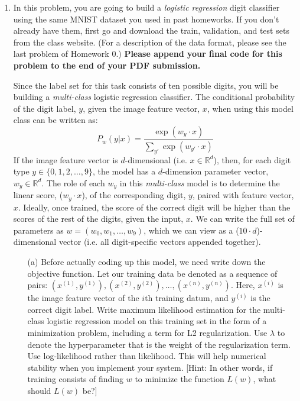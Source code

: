 \documentclass[10pt]{report}
\begin{document}
\begin{enumerate}
\begin{solution}
\end{solution}

\item In this problem, you are going to build a {\em logistic regression} digit classifier using the same MNIST dataset you used in past homeworks. If you don't already have them, first go and download the train, validation, and test sets from the class website. (For a description of the data format, please see the last problem of Homework 0.)  {\bf Please append your final code for this problem to the end of your PDF submission.}

\vspace{0.7em}

Since the label set for this task consists of ten possible digits, you will be building a {\em multi-class} logistic regression classifier. The conditional probability of the digit label, $y$, given the image feature vector, $x$, when using this model class can be written as:
\[
P_w(y|x) = \frac{\exp (w_y \cdot x)}{\sum_{y'} \exp (w_{y'} \cdot x)}       \]
If the image feature vector is $d$-dimensional (i.e. $x \in \mathbb{R}^d$), then, for each digit type $y \in \{0,1,2, \ldots, 9\}$, the model has a $d$-dimension parameter vector, $w_y \in \mathbb{R}^d$. The role of each $w_y$ in this {\em multi-class} model is to determine the linear score, ($w_y \cdot x$), of the corresponding digit, $y$, paired with feature vector, $x$. Ideally, once trained, the score of the correct digit will be higher than the scores of the rest of the digits, given the input, $x$. We can write the full set of parameters as $w = (w_0, w_1, \ldots, w_9)$, which we can view as a ($10 \cdot d$)-dimensional vector (i.e. all digit-specific vectors appended together).



\begin{enumerate}
\item[(a)] Before actually coding up this model, we need write down the objective function. Let our training data be denoted as a sequence of pairs: $(x^{(1)},y^{(1)}), (x^{(2)},y^{(2)}), \ldots, (x^{(n)},y^{(n)})$. Here, $x^{(i)}$ is the image feature vector of the $i$th training datum, and $y^{(i)}$ is the correct digit label. Write maximum likelihood estimation for the multi-class logistic regression model on this training set in the form of a minimization problem, including a term for L2 regularization. Use $\lambda$ to denote the hyperparameter that is the weight of the regularization term. Use log-likelihood rather than likelihood. This will help numerical stability when you implement your system. [Hint: In other words, if training consists of finding $w$ to minimize the function $L(w)$, what should $L(w)$ be?]
\begin{solution}


\end{solution}
\end{enumerate}
\end{enumerate}
\end{document}
